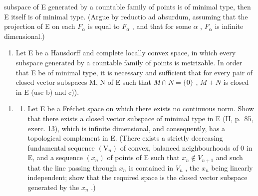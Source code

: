 subspace of E generated by a countable family of points is of minimal type, then E itself is of minimal type. (Argue by reductio ad absurdum, assuming that the projection of E on each \(F_{\alpha}\) is equal to \(F_{\alpha}\) , and that for some \(\alpha\) , \(F_{\alpha}\) is infinite dimensional.)

\begin{enumerate}
\def\labelenumi{\alph{enumi})}
\setcounter{enumi}{3}
\tightlist
\item
  Let E be a Hausdorff and complete locally convex space, in which every subspace generated by a countable family of points is metrizable. In order that E be of minimal type, it is necessary and sufficient that for every pair of closed vector subspaces M, N of E such that \(M \cap N = \{0\}\) , \(M + N\) is closed in E (use b) and c)).
\end{enumerate}

\begin{enumerate}
\def\labelenumi{\arabic{enumi})}
\setcounter{enumi}{13}
\tightlist
\item
  \begin{enumerate}
  \def\labelenumii{\alph{enumii})}
  \tightlist
  \item
    Let E be a Fréchet space on which there exists no continuous norm. Show that there exists a closed vector subspace of minimal type in E (II, p.~85, exerc. 13), which is infinite dimensional, and consequently, has a topological complement in E. (There exists a strictly decreasing fundamental sequence \((\mathrm{V}_{n})\) of convex, balanced neighbourhoods of 0 in E, and a sequence \((x_{n})\) of points of E such that \(x_{n} \notin V_{n+1}\) and such that the line passing through \(x_{n}\) is contained in \(V_{n}\) , the \(x_{n}\) being linearly independent; show that the required space is the closed vector subspace generated by the \(x_{n}\) .)
  \end{enumerate}
\end{enumerate}

